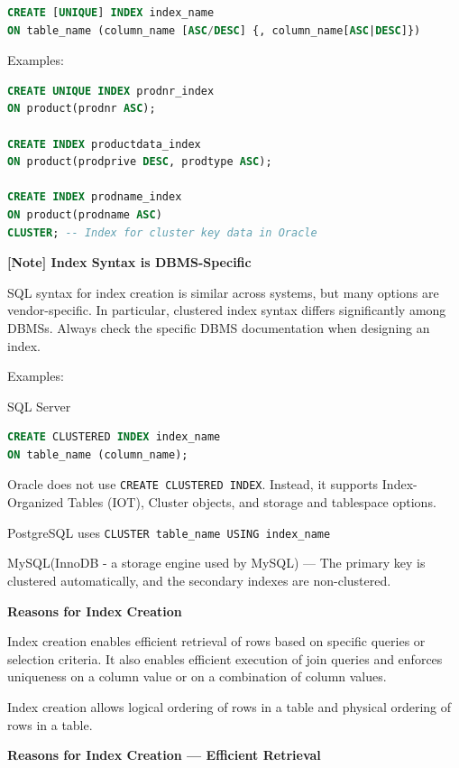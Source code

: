 \documentclass[11pt]{article}
\newcommand{\vs}[]{
    \vspace{11pt}
}
\newcommand{\boldsec}[1]{
    \vspace{11pt}
    \textbf{#1}
    \vspace{11pt}
}
\newcommand{\boldsecbottom}[1]{
    \textbf{#1}
    \vspace{11pt}
}
\begin{document}
\vs
\begin{lstlisting}[language=sql, breaklines=true, showstringspaces=false]
CREATE [UNIQUE] INDEX index_name
ON table_name (column_name [ASC/DESC] {, column_name[ASC|DESC]})
\end{lstlisting}
\vs

Examples:

\vs
\begin{lstlisting}[language=sql, breaklines=true, showstringspaces=false]
CREATE UNIQUE INDEX prodnr_index
ON product(prodnr ASC);

CREATE INDEX productdata_index
ON product(prodprive DESC, prodtype ASC);

CREATE INDEX prodname_index
ON product(prodname ASC)
CLUSTER; -- Index for cluster key data in Oracle
\end{lstlisting}
\vs

\boldsecbottom{[Note] Index Syntax is DBMS-Specific}

SQL syntax for index creation is similar across systems, but many options are vendor-specific. In particular, clustered index syntax differs significantly among DBMSs. Always check the specific DBMS documentation when designing an index.

Examples:

SQL Server
\vs
\begin{lstlisting}[language=sql, breaklines=true, showstringspaces=false]
CREATE CLUSTERED INDEX index_name
ON table_name (column_name);
\end{lstlisting}
\vs

Oracle does not use \texttt{CREATE CLUSTERED INDEX}. Instead, it supports Index-Organized Tables (IOT), Cluster objects, and storage and tablespace options.

PostgreSQL uses \texttt{CLUSTER table\_name USING index\_name}

MySQL(InnoDB - a storage engine used by MySQL) --- The primary key is clustered automatically, and the secondary indexes are non-clustered.

\boldsec{Reasons for Index Creation}

Index creation enables efficient retrieval of rows based on specific queries or selection criteria. It also enables efficient execution of join queries and enforces uniqueness on a column value or on a combination of column values.

Index creation allows logical ordering of rows in a table and physical ordering of rows in a table.

\boldsec{Reasons for Index Creation --- Efficient Retrieval}
\end{document}
